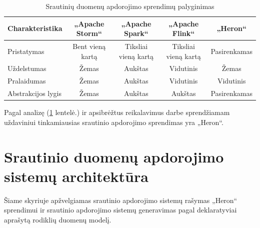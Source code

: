\documentclass{VUMIFPSbakalaurinis}
\begin{document}
\begin{table}[!htbp]
    \begin{center}
        \caption{Srautinių duomenų apdorojimo sprendimų palyginimas}
        \label{table:comparer}
        \begin{tabular}{ | l | c | c | c | c | }
            \hline
            \cellcolor[gray]{0.8} Charakteristika & \cellcolor[gray]{0.9} „Apache Storm“ & \cellcolor[gray]{0.9} „Apache Spark“ & \cellcolor[gray]{0.9} „Apache Flink“ & \cellcolor[gray]{0.9} „Heron“ \\* \hline
            \cellcolor[gray]{0.9} Pristatymas & Bent vieną kartą & Tiksliai vieną kartą & Tiksliai vieną kartą & Pasirenkamas \\* \hline
            \cellcolor[gray]{0.9} Uždelstumas & Žemas & Aukštas & Vidutinis & Žemas \\* \hline
            \cellcolor[gray]{0.9} Pralaidumas & Žemas & Aukštas & Vidutinis & Vidutinis \\* \hline
            \cellcolor[gray]{0.9} Abstrakcijos lygis & Žemas & Aukštas & Aukštas & Pasirenkamas \\* \hline
        \end{tabular}
    \end{center}
\end{table}\par

Pagal analizę (\ref{table:comparer} lentelė.) ir apsibrėžtus reikalavimus darbe sprendžiamam uždaviniui tinkamiausias srautinio apdorojimo sprendimas yra „Heron“. \par

\section{Srautinio duomenų apdorojimo sistemų architektūra}

Šiame skyriuje apžvelgiamas srautinio apdorojimo sistemų rašymas „Heron“ sprendimui ir srautinio apdorojimo sistemų generavimas pagal deklaratyviai aprašytą rodiklių duomenų modelį.
\end{document}
